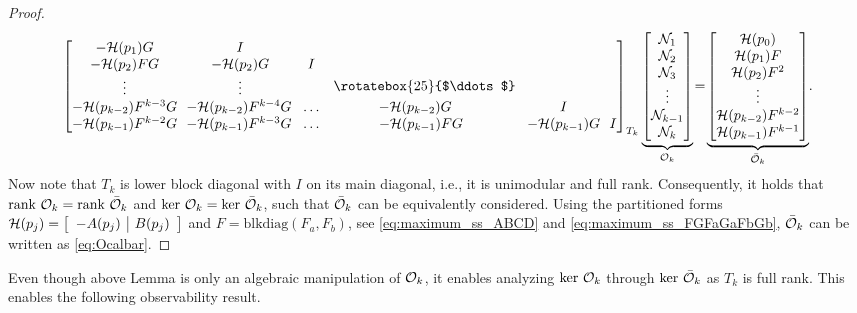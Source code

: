 \begin{proof}
\begin{equation}
{\begin{bmatrix}
            -\Hcal(p_1) G & I & & & &  \\
            -\Hcal(p_2) F G & -\Hcal(p_2) G & I & & & \\
            \vdots & \vdots & & \raisebox{3pt}{\rotatebox{25}{$\ddots$}} & & \\
            -\Hcal(p_{k-2})F^{k-3}G & \!\! -\Hcal(p_{k-2})F^{k-4}G \!& \hdots & \!\!\!\!\!\!\!\!-\Hcal(p_{k-2})G & I &\\
            -\Hcal(p_{k-1})F^{k-2} G &\!\! -\Hcal(p_{k-1})F^{k-3} G \! & \hdots & \!\!\!-\Hcal(p_{k-1})FG & \! -\Hcal(p_{k-1})G \! & \! I  
        \end{bmatrix}
        }_{T_k}
        \underbrace{
        \begin{bmatrix}
            \mathcal{N}_1 \\
            \mathcal{N}_2 \\
            \mathcal{N}_3 \\
            \vdots \\
            \mathcal{N}_{k-1} \\
            \mathcal{N}_{k}
        \end{bmatrix}
        }_{\Ocal_k}
        \!=\! 
        \underbrace{
        \begin{bmatrix}
            \Hcal(p_0) \\
            \Hcal(p_1) F \\
            \Hcal(p_2) F^2 \\
            \vdots \\
            \Hcal(p_{k-2}) F^{k-2} \\
            \Hcal(p_{k-1}) F^{k-1}
        \end{bmatrix}
        }_{\bar{\Ocal}_k}
        \!.
    \end{equation}
    Now note that $T_k$ is lower block diagonal with $I$ on its main diagonal, i.e., it is unimodular and full rank. Consequently, it holds that $\textrm{rank}\ \mathcal{O}_k = \textrm{rank}\ \bar{\mathcal{O}}_k$ and $\ker\ \Ocal_k = \ker\ \bar{\Ocal}_k$, such that $\bar{\mathcal{O}}_k$ can be equivalently considered. Using the partitioned forms $\mathcal{H}(p_j) = \left[\begin{array}{c|c} -A(p_j) & B(p_j) \end{array}\right]$ and $F = \textrm{blkdiag}(F_a,F_b)$, see \eqref{eq:maximum_ss_ABCD} and \eqref{eq:maximum_ss_FGFaGaFbGb}, $\bar{\mathcal{O}}_k$ can be written as \eqref{eq:Ocalbar}.   
\end{proof}
Even though above Lemma is only an algebraic manipulation of $\mathcal{O}_k$, it enables analyzing $\text{ker}\ \mathcal{O}_k$ through $\text{ker}\ \bar{\mathcal{O}}_k$ as $T_k$ is full rank. This enables the following observability result.

